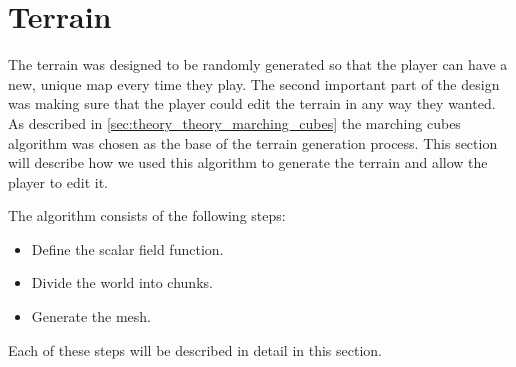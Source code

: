 \section{Terrain} \label{sec:system_architecture_terrain}
The terrain was designed to be randomly generated so that the player can have a new, unique map every time they play.
The second important part of the design was making sure that the player could edit the terrain in any way they wanted.
As described in \autoref{sec:theory_theory_marching_cubes} the marching cubes algorithm was chosen as the base of the terrain generation process.
This section will describe how we used this algorithm to generate the terrain and allow the player to edit it.

The algorithm consists of the following steps:
\begin{itemize}
    \item Define the scalar field function.
    \item Divide the world into chunks.
    \item Generate the mesh.
\end{itemize}

Each of these steps will be described in detail in this section.





